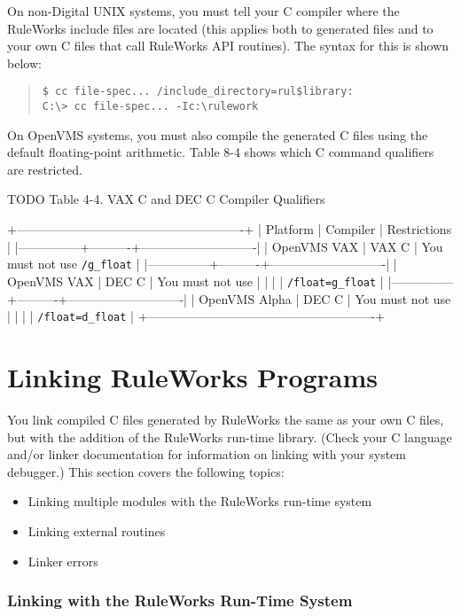 On non-Digital UNIX systems, you must tell your C compiler where the
RuleWorks include files are located (this applies both to generated
files and to your own C files that call RuleWorks API routines). The
syntax for this is shown below:

\begin{quote}
\begin{verbatim}
$ cc file-spec... /include_directory=rul$library:
C:\> cc file-spec... -Ic:\rulework
\end{verbatim}
\end{quote}

On OpenVMS systems, you must also compile the generated C files using
the default floating-point arithmetic. Table 8-4 shows which C command
qualifiers are restricted.

TODO
Table 4-4. VAX C and DEC C Compiler Qualifiers

+-------------------------------------------------------+
| Platform      | Compiler | Restrictions               |
|---------------+----------+----------------------------|
| OpenVMS VAX   | VAX C    | You must not use \verb|/g_float|  |
|---------------+----------+----------------------------|
| OpenVMS VAX   | DEC C    | You must not use           |
|               |          | \verb|/float=g_float|             |
|---------------+----------+----------------------------|
| OpenVMS Alpha | DEC C    | You must not use           |
|               |          | \verb|/float=d_float|             |
+-------------------------------------------------------+


\section{Linking RuleWorks Programs}

You link compiled C files generated by RuleWorks the same as your own
C files, but with the addition of the RuleWorks run-time
library. (Check your C language and/or linker documentation for
information on linking with your system debugger.) This section covers
the following topics:

\begin{itemize}
\item Linking multiple modules with the RuleWorks run-time system
\item Linking external routines
\item Linker errors
\end{itemize}

\subsubsection{Linking with the RuleWorks Run-Time System}

